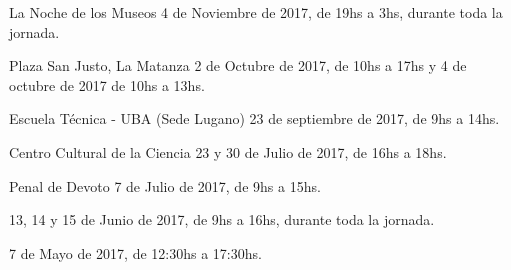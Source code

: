 \begin{enumerate}[leftmargin=0.8cm]
{\begin{itemize}[leftmargin=0.2cm]
{\begin{itemize}[leftmargin=0.2cm]
          {La Noche de los Museos}
          {4 de Noviembre de 2017, de 19hs a 3hs, durante toda la jornada.}

          {Plaza San Justo, La Matanza}
          {2 de Octubre de 2017, de 10hs a 17hs y 4 de octubre de 2017 de 10hs a 13hs.}

          {Escuela Técnica - UBA (Sede Lugano)}
          {23 de septiembre de 2017, de 9hs a 14hs.}

          {Centro Cultural de la Ciencia}
          {23 y 30 de Julio de 2017, de 16hs a 18hs.}

          {Penal de Devoto}
          {7 de Julio de 2017, de 9hs a 15hs.}

          {}{13, 14 y 15 de Junio de 2017, de 9hs a 16hs, durante toda la jornada.}

          {}{7 de Mayo de 2017, de 12:30hs a 17:30hs.}


\end{itemize}}
\end{itemize}}
\end{enumerate}
